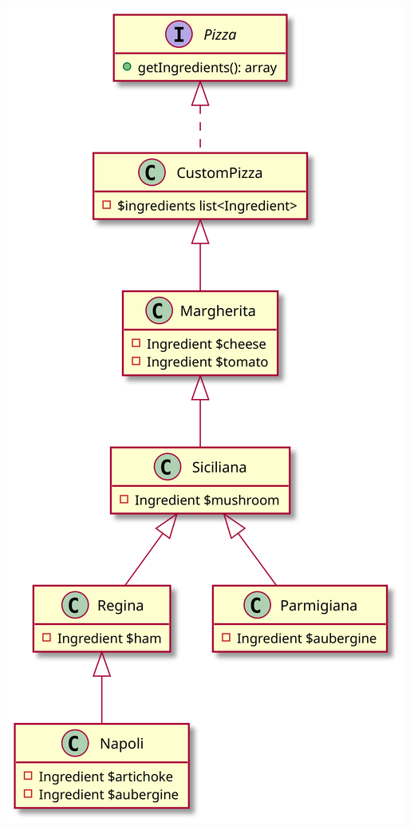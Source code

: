 \begin{frame}[fragile,c]
    \begin{center}
        \includegraphics[height=\textheight]{src/session--composition-and-inheritance/resources/summary-oop-pizza.png}
    \end{center}
\end{frame}


